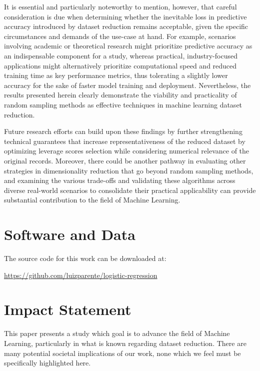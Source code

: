 \documentclass{article}
\theoremstyle{plain}
\theoremstyle{definition}
\theoremstyle{remark}
\begin{document}
It is essential and particularly noteworthy to mention, however, that careful consideration is due when determining whether the inevitable loss in predictive accuracy introduced by dataset reduction remains acceptable, given the specific circumstances and demands of the use-case at hand. For example, scenarios involving academic or theoretical research might prioritize predictive accuracy as an indispensable component for a study, whereas practical, industry-focused applications might alternatively prioritize computational speed and reduced training time as key performance metrics, thus tolerating a slightly lower accuracy for the sake of faster model training and deployment. Nevertheless, the results presented herein clearly demonstrate the viability and practicality of random sampling methods as effective techniques in machine learning dataset reduction. 

Future research efforts can build upon these findings by further strengthening technical guarantees that increase representativeness of the reduced dataset by optimizing leverage scores selection while considering numerical relevance of the original records. Moreover, there could be another pathway in evaluating other strategies in dimensionality reduction that go beyond random sampling methods, and examining the various trade-offs and validating these algorithms across diverse real-world scenarios to consolidate their practical applicability can provide substantial contribution to the field of Machine Learning.


\section*{Software and Data}

The source code for this work can be downloaded at:

\url{https://github.com/luizparente/logistic-regression}

\section*{Impact Statement}

This paper presents a study which goal is to advance the field of
Machine Learning, particularly in what is known regarding dataset reduction. There are many potential societal implications
of our work, none which we feel must be specifically highlighted here.




\end{document}
